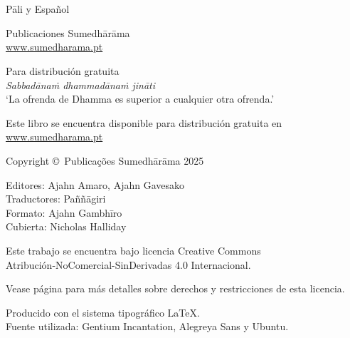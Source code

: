 
\thispagestyle{empty}

\enlargethispage{\baselineskip}

{\centering\small
\setlength{\parskip}{15pt}

{\normalsize
\thetitle\\
\thesubtitle\\
Pāli y Español}

Publicaciones Sumedhārāma\\
\href{http://sumedharama.pt}{www.sumedharama.pt}

Para distribución gratuita\\
\textit{Sabbadānaṁ dhammadānaṁ jināti}\\
‘La ofrenda de Dhamma es superior a cualquier otra ofrenda.’

Este libro se encuentra disponible para distribución gratuita en\\
\href{http://sumedharama.pt}{www.sumedharama.pt}


Copyright \copyright\ Publicações Sumedhārāma 2025

Editores: Ajahn Amaro, Ajahn Gavesako\\
Traductores: Paññāgiri\\
Formato: Ajahn Gambhīro\\
Cubierta: Nicholas Halliday

\vfill

Este trabajo se encuentra bajo licencia Creative Commons\\
Atribución-NoComercial-SinDerivadas 4.0 Internacional.

Vease página \pageref{copyright-details} para más detalles sobre derechos y restricciones de esta licencia.

Producido con el sistema tipográfico \LaTeX.\\
Fuente utilizada: Gentium Incantation, Alegreya Sans y Ubuntu.

\theEditionInfo

}
